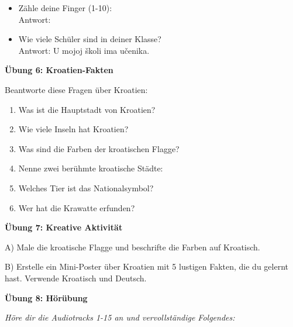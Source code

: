 \begin{exercise}
\begin{itemize}
    \item Zähle deine Finger (1-10): \\
    Antwort: \underline{\hspace{8cm}}
    
    \item Wie viele Schüler sind in deiner Klasse? \\
    Antwort: U mojoj školi ima \underline{\hspace{4cm}} učenika.
\end{itemize}

\vspace{2cm}

\textbf{Übung 6: Kroatien-Fakten}

Beantworte diese Fragen über Kroatien:

\begin{enumerate}
    \item Was ist die Hauptstadt von Kroatien? \underline{\hspace{6cm}}
    \item Wie viele Inseln hat Kroatien? \underline{\hspace{6cm}}
    \item Was sind die Farben der kroatischen Flagge? \underline{\hspace{6cm}}
    \item Nenne zwei berühmte kroatische Städte: \underline{\hspace{6cm}}
    \item Welches Tier ist das Nationalsymbol? \underline{\hspace{6cm}}
    \item Wer hat die Krawatte erfunden? \underline{\hspace{6cm}}
\end{enumerate}

\vspace{2cm}

\textbf{Übung 7: Kreative Aktivität}

A) Male die kroatische Flagge und beschrifte die Farben auf Kroatisch.

\vspace{5cm}

B) Erstelle ein Mini-Poster über Kroatien mit 5 lustigen Fakten, die du gelernt hast. Verwende Kroatisch und Deutsch.

\vspace{5cm}

\textbf{Übung 8: Hörübung}

\textit{Höre dir die Audiotracks 1-15 an und vervollständige Folgendes:}


\end{exercise}
